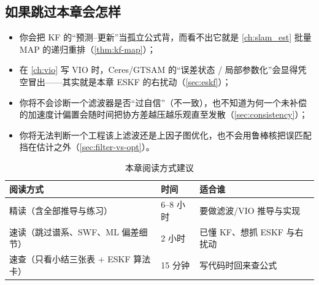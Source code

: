 \subsection*{如果跳过本章会怎样}
\begin{itemize}
  \item 你会把 KF 的“预测–更新”当孤立公式背，而看不出它就是 \cref{ch:slam_est} 批量 MAP 的递归重排（\cref{thm:kf-map}）；
  \item 在 \cref{ch:vio} 写 VIO 时，Ceres/GTSAM 的“误差状态 / 局部参数化”会显得凭空冒出——其实就是本章 ESKF 的右扰动（\cref{sec:eskf}）；
  \item 你将不会诊断一个滤波器是否“过自信”（不一致），也不知道为何一个未补偿的加速度计偏置会随时间把协方差越压越乐观直至发散（\cref{sec:consistency}）；
  \item 你将无法判断一个工程该上滤波还是上因子图优化，也不会用鲁棒核把误匹配挡在估计之外（\cref{sec:filter-vs-opt}）。
\end{itemize}

\begin{table}[ht]\centering\small
\caption{本章阅读方式建议}
\begin{tabular}{lll}
\toprule
阅读方式 & 时间 & 适合谁 \\
\midrule
精读（含全部推导与练习） & 6--8 小时 & 要做滤波/VIO 推导与实现 \\
速读（跳过谱系、SWF、ML 偏差细节） & 2 小时 & 已懂 KF、想抓 ESKF 与右扰动 \\
速查（只看小结三张表 + ESKF 算法卡） & 15 分钟 & 写代码时回来查公式 \\
\bottomrule
\end{tabular}
\end{table}


